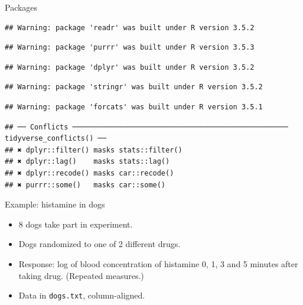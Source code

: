 \documentclass[ignorenonframetext,]{beamer}
\begin{document}
\begin{frame}[fragile]{Packages}
\begin{verbatim}
## Warning: package 'readr' was built under R version 3.5.2
\end{verbatim}

\begin{verbatim}
## Warning: package 'purrr' was built under R version 3.5.3
\end{verbatim}

\begin{verbatim}
## Warning: package 'dplyr' was built under R version 3.5.2
\end{verbatim}

\begin{verbatim}
## Warning: package 'stringr' was built under R version 3.5.2
\end{verbatim}

\begin{verbatim}
## Warning: package 'forcats' was built under R version 3.5.1
\end{verbatim}

\begin{verbatim}
## ── Conflicts ─────────────────────────────────────────────────── tidyverse_conflicts() ──
## ✖ dplyr::filter() masks stats::filter()
## ✖ dplyr::lag()    masks stats::lag()
## ✖ dplyr::recode() masks car::recode()
## ✖ purrr::some()   masks car::some()
\end{verbatim}

\end{frame}

\begin{frame}[fragile]{Example: histamine in dogs}
\protect\hypertarget{example-histamine-in-dogs}{}

\begin{itemize}
\item
  8 dogs take part in experiment.
\item
  Dogs randomized to one of 2 different drugs.
\item
  Response: log of blood concentration of histamine 0, 1, 3 and 5
  minutes after taking drug. (Repeated measures.)
\item
  Data in \texttt{dogs.txt}, column-aligned.
\end{itemize}

\end{frame}
\end{document}
